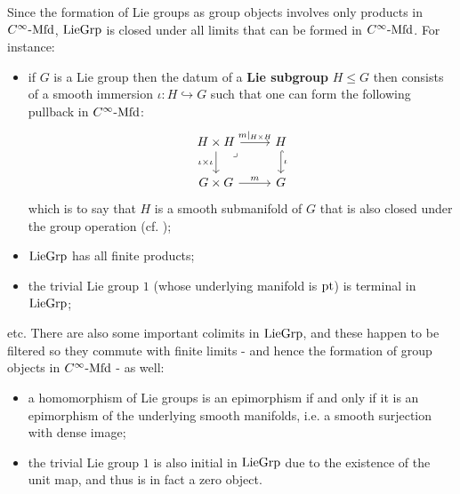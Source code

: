         Since the formation of Lie groups as group objects involves only products in $C^{\infty}\text{-}\mathrm{Mfd}$, $\mathrm{Lie}\mathrm{Grp}$ is closed under all limits that can be formed in $C^{\infty}\text{-}\mathrm{Mfd}$. For instance:
        \begin{itemize}
            \item if $G$ is a Lie group then the datum of a \textbf{Lie subgroup} $H \leq G$ then consists of a smooth immersion $\iota: H \hookrightarrow G$ such that one can form the following pullback in $C^{\infty}\text{-}\mathrm{Mfd}$:
                $$
                    \begin{tikzcd}
                	{H \x H} & H \\
                	{G \x G} & G
                	\arrow["{m|_{H \x H}}", from=1-1, to=1-2]
                	\arrow["{\iota \x \iota}"', from=1-1, to=2-1]
                	\arrow["\lrcorner"{anchor=center, pos=0.125}, draw=none, from=1-1, to=2-2]
                	\arrow["\iota", hook, from=1-2, to=2-2]
                	\arrow["m", from=2-1, to=2-2]
                    \end{tikzcd}
                $$
            which is to say that $H$ is a smooth submanifold of $G$ that is also closed under the group operation (cf. \cite[Proposition 7.11]{lee_smooth_manifolds});
            \item $\mathrm{Lie}\mathrm{Grp}$ has all finite products;
            \item the trivial Lie group $1$ (whose underlying manifold is $\mathrm{pt}$) is terminal in $\mathrm{Lie}\mathrm{Grp}$;
        \end{itemize}
        etc. There are also some important colimits in $\mathrm{Lie}\mathrm{Grp}$, and these happen to be filtered so they commute with finite limits - and hence the formation of group objects in $C^{\infty}\text{-}\mathrm{Mfd}$ - as well:
        \begin{itemize}
            \item a homomorphism of Lie groups is an epimorphism if and only if it is an epimorphism of the underlying smooth manifolds, i.e. a smooth surjection with dense image;
            \item the trivial Lie group $1$ is also initial in $\mathrm{Lie}\mathrm{Grp}$ due to the existence of the unit map, and thus is in fact a zero object.
        \end{itemize}

